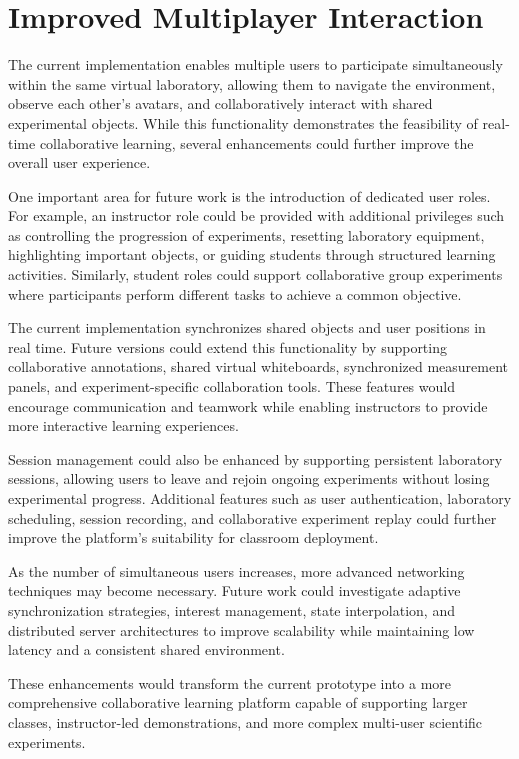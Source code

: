 \section{Improved Multiplayer Interaction}

The current implementation enables multiple users to participate simultaneously within the same virtual laboratory, allowing them to navigate the environment, observe each other's avatars, and collaboratively interact with shared experimental objects. While this functionality demonstrates the feasibility of real-time collaborative learning, several enhancements could further improve the overall user experience.

One important area for future work is the introduction of dedicated user roles. For example, an instructor role could be provided with additional privileges such as controlling the progression of experiments, resetting laboratory equipment, highlighting important objects, or guiding students through structured learning activities. Similarly, student roles could support collaborative group experiments where participants perform different tasks to achieve a common objective.

The current implementation synchronizes shared objects and user positions in real time. Future versions could extend this functionality by supporting collaborative annotations, shared virtual whiteboards, synchronized measurement panels, and experiment-specific collaboration tools. These features would encourage communication and teamwork while enabling instructors to provide more interactive learning experiences.

Session management could also be enhanced by supporting persistent laboratory sessions, allowing users to leave and rejoin ongoing experiments without losing experimental progress. Additional features such as user authentication, laboratory scheduling, session recording, and collaborative experiment replay could further improve the platform's suitability for classroom deployment.

As the number of simultaneous users increases, more advanced networking techniques may become necessary. Future work could investigate adaptive synchronization strategies, interest management, state interpolation, and distributed server architectures to improve scalability while maintaining low latency and a consistent shared environment.

These enhancements would transform the current prototype into a more comprehensive collaborative learning platform capable of supporting larger classes, instructor-led demonstrations, and more complex multi-user scientific experiments.

